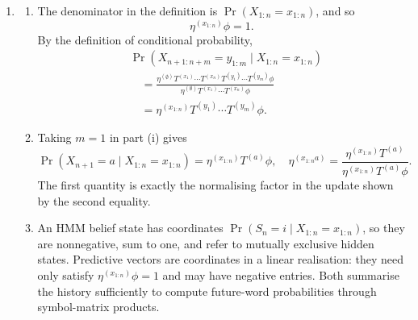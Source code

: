 \documentclass[11pt]{article}
\begin{document}
\begin{solution}[ex:p3-4]
\begin{enumerate}
      \item
        \begin{enumerate}
          \item The denominator in the definition is
            $\Pr(X_{1:n}=x_{1:n})$, and so
            \[
              \eta^{(x_{1:n})}\phi=1.
            \]
            By the definition of conditional probability,
            \[
              \begin{aligned}
                &\Pr(X_{n+1:n+m}=y_{1:m}\mid X_{1:n}=x_{1:n})\\
                &\quad=
                  \frac{\eta^{(\emptyset)}
                    T^{(x_1)}\cdots T^{(x_n)}
                    T^{(y_1)}\cdots T^{(y_m)}\phi}
                  {\eta^{(\emptyset)}
                    T^{(x_1)}\cdots T^{(x_n)}\phi}\\
                &\quad=
                  \eta^{(x_{1:n})}
                    T^{(y_1)}\cdots T^{(y_m)}\phi.
              \end{aligned}
            \]

          \item Taking $m=1$ in part (i) gives
            \[
              \Pr(X_{n+1}=a\mid X_{1:n}=x_{1:n})
                =\eta^{(x_{1:n})}T^{(a)}\phi,
              \quad
              \eta^{(x_{1:n}a)}
                =\frac{\eta^{(x_{1:n})}T^{(a)}}
                  {\eta^{(x_{1:n})}T^{(a)}\phi}.
            \]
            The first quantity is exactly the normalising factor in the
            update shown by the second equality.

          \item An HMM belief state has coordinates
            $\Pr(S_n=i\mid X_{1:n}=x_{1:n})$, so they are nonnegative, sum to
            one, and refer to mutually exclusive hidden states. Predictive
            vectors are coordinates in a linear realisation: they need only
            satisfy $\eta^{(x_{1:n})}\phi=1$ and may have negative entries.
            Both summarise the history sufficiently to compute future-word
            probabilities through symbol-matrix products.
        \end{enumerate}


\end{enumerate}
\end{solution}
\end{document}
